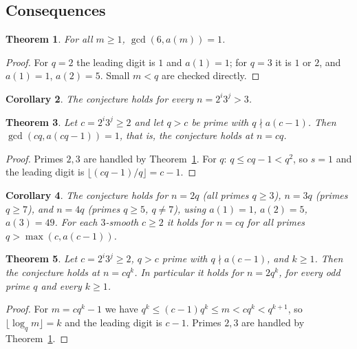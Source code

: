 \documentclass[11pt]{article}
\newtheorem{theorem}{Theorem}
\newtheorem{corollary}[theorem]{Corollary}
\theoremstyle{remark}\newtheorem{remark}[theorem]{Remark}
\begin{document}
\subsection{Consequences}
\begin{theorem}\label{thm:six}
For all $m\ge1$, $\gcd(6,a(m))=1$.
\end{theorem}
\begin{proof}
For $q=2$ the leading digit is $1$ and $a(1)=1$; for $q=3$ it is $1$ or $2$, and $a(1)=1$, $a(2)=5$. Small $m<q$ are checked directly.
\end{proof}
\begin{corollary}
The conjecture holds for every $n=2^i3^j>3$.
\end{corollary}
\begin{theorem}\label{thm:cq}
Let $c=2^i3^j\ge2$ and let $q>c$ be prime with $q\nmid a(c-1)$. Then $\gcd(cq,a(cq-1))=1$, that is, the conjecture holds at $n=cq$.
\end{theorem}
\begin{proof}
Primes $2,3$ are handled by Theorem~\ref{thm:six}. For $q$: $q\le cq-1<q^2$, so $s=1$ and the leading digit is $\lfloor (cq-1)/q\rfloor=c-1$.
\end{proof}
\begin{corollary}
The conjecture holds for $n=2q$ (all primes $q\ge3$), $n=3q$ (primes $q\ge7$), and $n=4q$ (primes $q\ge5$, $q\neq7$), using $a(1)=1$, $a(2)=5$, $a(3)=49$. For each $3$-smooth $c\ge2$ it holds for $n=cq$ for all primes $q>\max(c,a(c-1))$.
\end{corollary}

\begin{theorem}\label{thm:cqk}
Let $c=2^i3^j\ge2$, $q>c$ prime with $q\nmid a(c-1)$, and $k\ge1$. Then the conjecture holds at $n=cq^k$. In particular it holds for $n=2q^k$, for every odd prime $q$ and every $k\ge1$.
\end{theorem}
\begin{proof}
For $m=cq^k-1$ we have $q^k\le(c-1)q^k\le m<cq^k<q^{k+1}$, so $\lfloor\log_q m\rfloor=k$ and the leading digit is $c-1$. Primes $2,3$ are handled by Theorem~\ref{thm:six}.
\end{proof}
\end{document}
